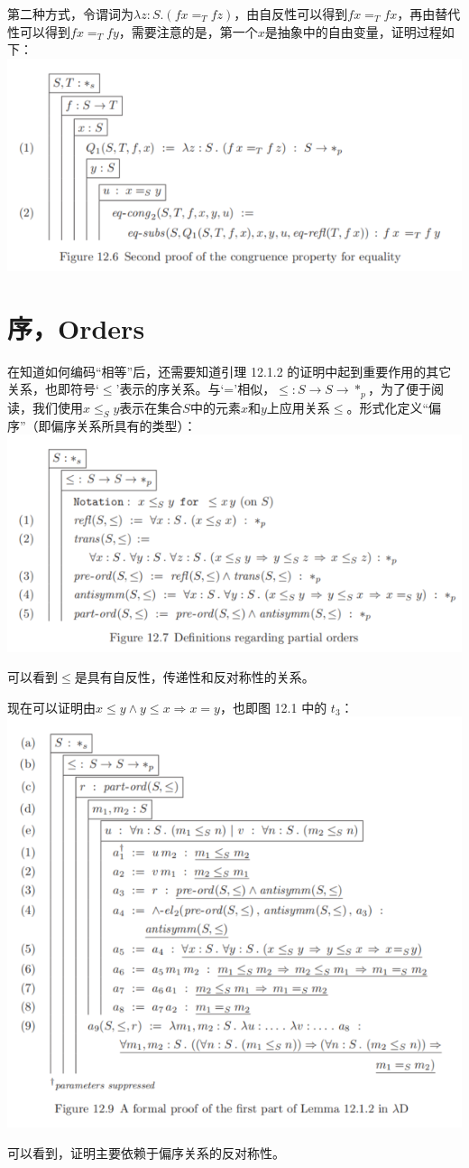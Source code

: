 \documentclass[UTF8]{article}
\begin{document}
		第二种方式，令谓词为$\lambda z:S.(fx=_T fz)$，由自反性可以得到$fx=_T fx$，再由替代性可以得到$fx=_T fy$，需要注意的是，第一个$x$是抽象中的自由变量，证明过程如下：\\
		\includegraphics[width=0.93\linewidth]{"../imgs/12-6.png"}
		
	\section{序，Orders}
	\noindent
	在知道如何编码“相等”后，还需要知道引理 12.1.2 的证明中起到重要作用的其它关系，也即符号`$\le$'表示的序关系。与`='相似，$\le:S\rightarrow S\rightarrow*_p$，为了便于阅读，我们使用$x\le_S y$表示在集合$S$中的元素$x$和$y$上应用关系$\le$。形式化定义“偏序”（即偏序关系所具有的类型）：\\
	\includegraphics[width=0.93\linewidth]{"../imgs/12-7.png"}
	
		可以看到$\le$是具有自反性，传递性和反对称性的关系。
		
		现在可以证明由$x\le y\land y\le x\Rightarrow x=y$，也即图 12.1 中的 $t_3$：\\
		\includegraphics[width=0.93\linewidth]{"../imgs/12-8.png"}
		
		可以看到，证明主要依赖于偏序关系的反对称性。
\end{document}
